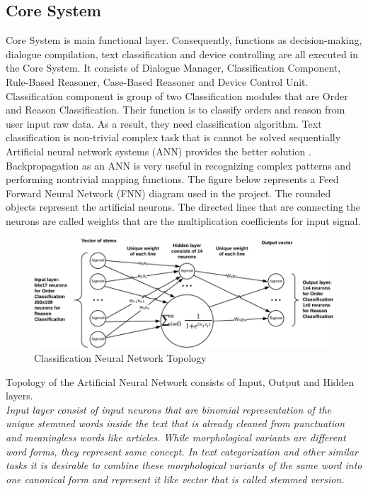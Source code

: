 \documentclass{llncs}
\begin{document}
    \subsection{Core System}
    Core System is main functional layer.
    Consequently, functions as decision-making, dialogue compilation, text classification and device controlling are all executed in the Core System.
    It consists of Dialogue Manager, Classification Component, Rule-Based Reasoner, Case-Based Reasoner and Device Control Unit.\\
    Classification component is group of two Classification modules that are Order and Reason Classification.
    Their function is to classify orders and reason from user input raw data.
    As a result, they need classification algorithm.
    Text classification is non-trivial complex task that is cannot be solved sequentially
    Artificial neural network systems (ANN) provides the better solution \cite{14}.
    Backpropagation as an ANN is very useful in recognizing complex patterns and performing nontrivial mapping functions.
    The figure below represents a Feed Forward Neural Network (FNN) diagram used in the project.
    The rounded objects represent the artificial neurons.
    The directed lines that are connecting the neurons are called weights that are the multiplication coefficients for input signal.\\
    \begin{figure}
        \includegraphics[width=\textwidth]{ANN.png}
        \caption[]{Classification Neural Network Topology}
    \end{figure}
    Topology of the Artificial Neural Network consists of Input, Output and Hidden layers.\\
    \em Input layer \em consist of input neurons that are binomial representation of the unique stemmed words inside the text that is already cleaned from punctuation and meaningless words like articles.
    While morphological variants are different word forms, they represent same concept.
    In text categorization and other similar tasks it is desirable to combine these morphological variants of the same word into one canonical form and represent it like vector that is called stemmed version.\\
\end{document}

